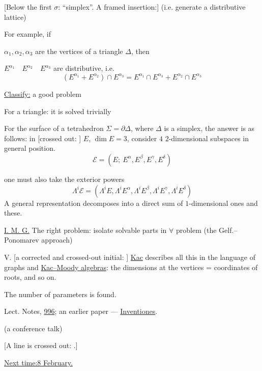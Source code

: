 [Below the first $\sigma$: “simplex”. A framed insertion:]
(i.e. generate a distributive lattice)

For example, if

$\alpha_1,\alpha_2,\alpha_3$ are the vertices of a triangle $\Delta$, then

$E^{\alpha_1}\quad E^{\alpha_2}\quad E^{\alpha_3}$ are distributive, i.e.
\begin{equation*}
(E^{\alpha_1}+E^{\alpha_2})\cap E^{\alpha_3}
=E^{\alpha_1}\cap E^{\alpha_3}+E^{\alpha_2}\cap E^{\alpha_3}
\end{equation*}

\underline{Classify:} a good problem

For a triangle: it is solved trivially

For the surface of a tetrahedron $\Sigma=\partial\Delta$, where $\Delta$ is a simplex, the answer
is as follows: in [crossed out:
]
$E$, $\dim E=3$, consider $4$ $2$-dimensional subspaces in general position.
\begin{equation*}
\mathcal E=(E;\ E^\alpha,E^\beta,E^\gamma,E^\delta)
\end{equation*}


one must also take the exterior powers
\begin{equation*}
\Lambda^i\mathcal E=
(\Lambda^i E,\Lambda^i E^\alpha,\Lambda^i E^\beta,
\Lambda^i E^\gamma,\Lambda^i E^\delta)
\end{equation*}
A general representation decomposes into a direct sum of $1$-dimensional ones and these.

\underline{I. M. G.}
The right problem: isolate solvable parts in $\forall$ problem
(the Gelf.–Ponomarev approach)

V. [a corrected and crossed-out initial:
]
\underline{Kac} describes all this in the language of graphs and
\underline{Kac–Moody algebras}:
the dimensions at the vertices = coordinates of roots, and so on.

The number of parameters is found.

Lect. Notes, \underline{996}; an earlier paper — \underline{Inventiones}.

(a conference talk)

[A line is crossed out:
.]


\underline{Next time:}\quad \underline{8 February.}

